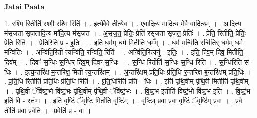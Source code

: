 \documentclass[17pt]{extarticle}
\begin{document}
\textbf{Jatai Paata} \newline

1. र॒श्मि रितीति॑ र॒श्मी र॒श्मि रिति॑ । . इत्ये॒वैवे तीत्ये॒व । . ए॒वादि॒त्य मा॑दि॒त्य मे॒वै वादि॒त्यम् । . आ॒दि॒त्य म॑सृजता सृजतादि॒त्य मा॑दि॒त्य म॑सृजत । . अ॒सृ॒ज॒त॒ प्रेतिः॒ प्रेति॑ रसृजता सृजत॒ प्रेतिः॑ । . प्रेति॒ रितीति॒ प्रेतिः॒ प्रेति॒ रिति॑ । . प्रेति॒रिति॒ प्र - इ॒तिः॒ । . इति॒ धर्म॒म् धर्म॒ मितीति॒ धर्म᳚म् । . धर्म॒ मन्वि॑ति॒ रन्वि॑ति॒र् धर्म॒म् धर्म॒ मन्वि॑तिः । . अन्वि॑ति॒रिती त्यन्वि॑ति॒ रन्वि॑ति॒ रिति॑ । . अन्वि॑ति॒रित्यनु॑ - इ॒तिः॒ । . इति॒ दिव॒म् दिव॒ मितीति॒ दिव᳚म् । . दिवꣳ॑ स॒न्धिः स॒न्धिर् दिव॒म् दिवꣳ॑ स॒न्धिः । . स॒न्धि रितीति॑ स॒न्धिः स॒न्धि रिति॑ । . स॒न्धिरिति॑ सं - धिः । . इत्य॒न्तरि॑क्ष म॒न्तरि॑क्ष॒ मिती त्य॒न्तरि॑क्षम् । . अ॒न्तरि॑क्षम् प्रति॒धिः प्र॑ति॒धि र॒न्तरि॑क्ष म॒न्तरि॑क्षम् प्रति॒धिः । . प्र॒ति॒धि रितीति॑ प्रति॒धिः प्र॑ति॒धि रिति॑ । . प्र॒ति॒धिरिति॑ प्रति - धिः । . इति॑ पृथि॒वीम् पृ॑थि॒वी मितीति॑ पृथि॒वीम् । . पृ॒थि॒वीं ॅवि॑ष्टं॒भो वि॑ष्टं॒भः पृ॑थि॒वीम् पृ॑थि॒वीं ॅवि॑ष्टं॒भः । . वि॒ष्टं॒भ इतीति॑ विष्टं॒भो वि॑ष्टं॒भ इति॑ । . वि॒ष्टं॒भ इति॑ वि - स्तं॒भः । . इति॒ वृष्टिं॒ ॅवृष्टि॒ मितीति॒ वृष्टि᳚म् । . वृष्टि॑म् प्र॒वा प्र॒वा वृष्टिं॒ ॅवृष्टि॑म् प्र॒वा । . प्र॒वे तीति॑ प्र॒वा प्र॒वेति॑ । . प्र॒वेति॑ प्र - वा । \newline
\end{document}
